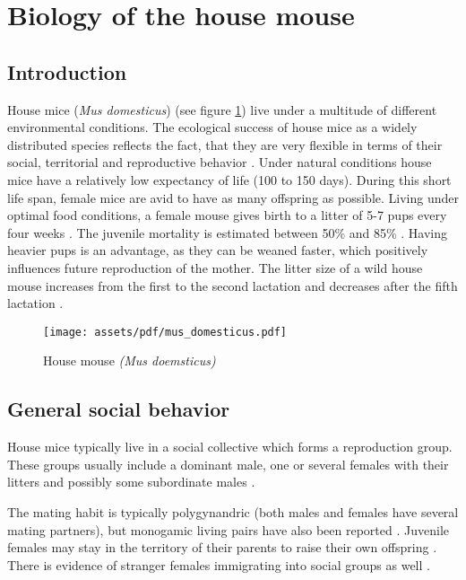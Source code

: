 \newpage
\section{Biology of the house mouse}
\label{sec:biolhousemice}

\subsection{Introduction}
\label{subsec:introduction}

House mice (\textit{Mus domesticus}) (see figure \ref{fig:housemice}) live under a multitude of different environmental conditions. The ecological success of house mice as a widely distributed species reflects the fact, that they are very flexible in terms of their social, territorial and reproductive behavior \cite{bronson:79, bronson:84, berry:81}. Under natural conditions house mice have a relatively low expectancy of life (100 to 150 days). During this short life span, female mice are avid to have as many offspring as possible. Living under optimal food conditions, a female mouse gives birth to a litter of 5-7 pups every four weeks \cite{berry:71, pelikan:81}. The juvenile mortality is estimated between 50\% and 85\% \cite{berry:71, berry:75, pennycuik:86}. Having heavier pups is an advantage, as they can be weaned faster, which positively influences future reproduction of the mother\cite{fuchs:82}. The litter size of a wild house mouse increases from the first to the second lactation and decreases after the fifth lactation \cite{pelikan:81, koenig:87b}. 

\begin{figure}[htbp]	
\centering	
\texttt{[image: assets/pdf/mus\_domesticus.pdf]}	
\caption[House mice]{House mouse \textit{(Mus doemsticus)}}
\label{fig:housemice}
\end{figure}

\subsection{General social behavior}
\label{subsec:socialbehaviour}
House mice typically live in a social collective which forms a reproduction group. These groups usually include a dominant male, one or several females with their litters and possibly some subordinate males \cite{crowcroft:63, reimer:67, selander:70, mackintosh:81}.

The mating habit is typically polygynandric (both males and females have several mating partners), but monogamic living pairs have also been reported \cite{lidicker:76}. Juvenile females may stay in the territory of their parents to raise their own offspring \cite{petras:67}. There is evidence of stranger females immigrating into social groups as well \cite{anderson:65, reimer:67, selander:70, bronson:79, baker:81}.     

